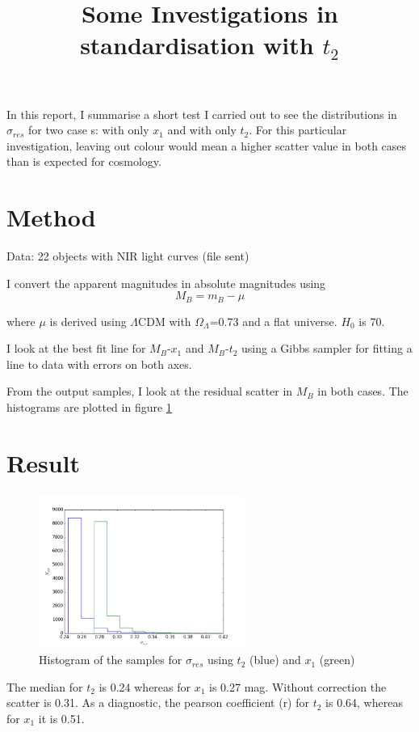 \documentclass{article}
\begin{document}
\title{Some Investigations in standardisation with $t_2$}
\maketitle
In this report, I summarise a short test I carried out to see the distributions in $\sigma_{res}$ for two case s: with only $x_1$ and with only $t_2$.  For this particular investigation, leaving out colour would mean a higher scatter value in both cases than is expected for cosmology.

\section{Method}
Data: 22 objects with NIR light curves (file sent)

I convert the apparent magnitudes in absolute magnitudes using 
\begin{equation}
M_B =m_B-\mu
\end{equation}

where $\mu$ is derived using $\Lambda$CDM with $\Omega_{\Lambda}$=0.73 and a flat universe. $H_0$ is 70. 

I look at the best fit line for $M_B$-$x_1$ and $M_B$-$t_2$ using a Gibbs sampler for fitting a line to data with errors on both axes. 

From the output samples, I look at the residual scatter in $M_B$ in both cases. The histograms are plotted in figure \ref{fig:stan}

\section{Result}
\begin{figure}
\includegraphics[width=0.6\textwidth]{../sigres.png}
\caption{Histogram of the samples for $\sigma_{res}$ using $t_2$ (blue) and $x_1$ (green)}
\label{fig:stan}
\end{figure}

The median for $t_2$ is 0.24 whereas for $x_1$ is 0.27 mag. Without correction the scatter is 0.31.
As a diagnostic, the pearson coefficient (r) for $t_2$ is 0.64, whereas for $x_1$ it is 0.51.
\end{document}
